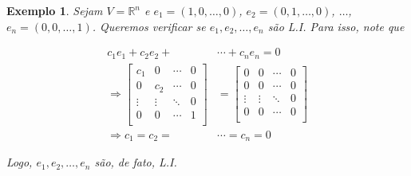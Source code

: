 \documentclass{article}
\newtheorem*{example}{Exemplo}
\begin{document}
\begin{example}
	Sejam $V = \mathbb{R}^n$ e $e_1 = (1, 0, \dots, 0)$, $e_2 = (0, 1, \dots, 0)$, $\dots$, $e_n = (0, 0, \dots, 1)$. Queremos verificar se $e_1, e_2, \dots, e_n$ são L.I. Para isso, note que
	
	\begin{align*}
	c_1e_1 + c_2e_2 + &\cdots + c_ne_n = 0 \\
	\Rightarrow \begin{bmatrix}
	c_1 & 0 & \cdots & 0 \\
	0 & c_2 & \cdots & 0 \\
	\vdots & \vdots & \ddots & 0 \\
	0 & 0 & \cdots & 1 \\
	\end{bmatrix} &= \begin{bmatrix}
	0 & 0 & \cdots & 0 \\
	0 & 0 & \cdots & 0 \\
	\vdots & \vdots & \ddots & 0 \\
	0 & 0 & \cdots & 0 \\
	\end{bmatrix}\\
	\Rightarrow c_1 = c_2 = &\cdots = c_n = 0
	\end{align*}
	
	\par\vspace{0.3cm} Logo, $e_1, e_2, \dots, e_n$ são, de fato, L.I.
	
\end{example}
\end{document}
